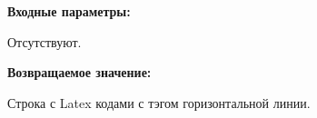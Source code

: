\textbf{Входные параметры:}

Отсутствуют.

\textbf{Возвращаемое значение:}

Строка с Latex кодами с тэгом горизонтальной линии.